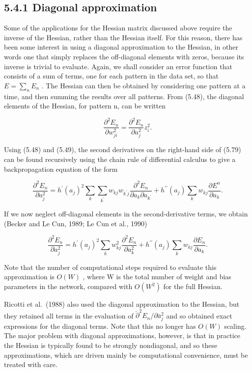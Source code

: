 \documentclass[
  10
]{article}
\begin{document}
\subsection{5.4.1 Diagonal approximation}\label{diagonal-approximation}

Some of the applications for the Hessian matrix discussed above require
the inverse of the Hessian, rather than the Hessian itself. For this
reason, there has been some interest in using a diagonal approximation
to the Hessian, in other words one that simply replaces the off-diagonal
elements with zeros, because its inverse is trivial to evaluate. Again,
we shall consider an error function that consists of a sum of terms, one
for each pattern in the data set, so that
\(\textstyle E = \sum _ { n } E _ { n }\) . The Hessian can then be
obtained by considering one pattern at a time, and then summing the
results over all patterns. From (5.48), the diagonal elements of the
Hessian, for pattern n, can be written

\[
\frac {\partial^ {2} E _ {n}}{\partial w _ {j i} ^ {2}} = \frac {\partial^ {2} E _ {n}}{\partial a _ {j} ^ {2}} z _ {i} ^ {2}.\tag{5.79}
\]

Using (5.48) and (5.49), the second derivatives on the right-hand side
of (5.79) can be found recursively using the chain rule of differential
calculus to give a backpropagation equation of the form

\[
\frac {\partial^ {2} E _ {n}}{\partial a _ {j} ^ {2}} = h ^ {\prime} (a _ {j}) ^ {2} \sum_ {k} \sum_ {k ^ {\prime}} w _ {k j} w _ {k ^ {\prime} j} \frac {\partial^ {2} E _ {n}}{\partial a _ {k} \partial a _ {k ^ {\prime}}} + h ^ {\prime \prime} (a _ {j}) \sum_ {k} w _ {k j} \frac {\partial E ^ {n}}{\partial a _ {k}}.\tag{5.80}
\]

If we now neglect off-diagonal elements in the second-derivative terms,
we obtain (Becker and Le Cun, 1989; Le Cun et al., 1990)

\[
\frac {\partial^ {2} E _ {n}}{\partial a _ {j} ^ {2}} = h ^ {\prime} (a _ {j}) ^ {2} \sum_ {k} w _ {k j} ^ {2} \frac {\partial^ {2} E _ {n}}{\partial a _ {k} ^ {2}} + h ^ {\prime \prime} (a _ {j}) \sum_ {k} w _ {k j} \frac {\partial E _ {n}}{\partial a _ {k}}.\tag{5.81}
\]

Note that the number of computational steps required to evaluate this
approximation is \(O ( W )\) , where W is the total number of weight and
bias parameters in the network, compared with \(O ( W ^ { 2 } )\) for
the full Hessian.

Ricotti et al.~(1988) also used the diagonal approximation to the
Hessian, but they retained all terms in the evaluation of
\(\breve { \partial } ^ { 2 } E _ { n } / \partial \bar { a } _ { j } ^ { 2 }\)
and so obtained exact expressions for the diagonal terms. Note that this
no longer has \(O ( W )\) scaling. The major problem with diagonal
approximations, however, is that in practice the Hessian is typically
found to be strongly nondiagonal, and so these approximations, which are
driven mainly be computational convenience, must be treated with care.
\end{document}
